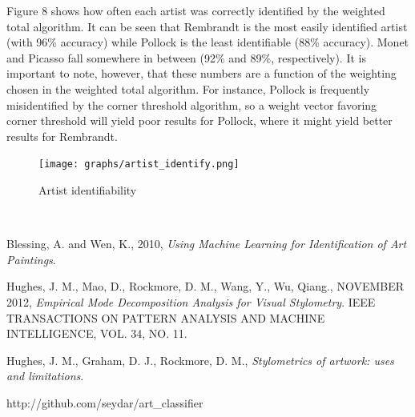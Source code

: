 \documentclass{article}
\begin{document}
  Figure 8 shows how often each artist was correctly identified by the
  weighted total algorithm. It can be seen that Rembrandt is the most easily
  identified artist (with 96\% accuracy) while Pollock is the least identifiable
  (88\% accuracy). Monet and Picasso fall somewhere in between (92\% and 89\%,
  respectively). It is important to note, however, that these numbers are a
  function of the weighting chosen in the weighted total algorithm. For instance,
  Pollock is frequently misidentified by the corner threshold algorithm, so a
  weight vector favoring corner threshold will yield poor results for Pollock,
  where it might yield better results for Rembrandt. 
  \begin{figure}[h!]
    \begin{center}
      \texttt{[image: graphs/artist\_identify.png]}
      \caption{Artist identifiability}
    \end{center}
  \end{figure} \\

  \begin{thebibliography}{1}
     Blessing, A. and Wen, K.,
    2010,
    \emph{Using Machine Learning for Identification of Art Paintings}.
  
     Hughes, J. M., Mao, D., Rockmore, D. M.,
    Wang, Y., Wu, Qiang.,
    NOVEMBER 2012,
    \emph{Empirical Mode Decomposition Analysis for Visual Stylometry}.
    IEEE TRANSACTIONS ON PATTERN ANALYSIS AND MACHINE INTELLIGENCE,
    VOL. 34,
    NO. 11.
  
     Hughes, J. M., Graham, D. J., Rockmore, D. M.,
    \emph{Stylometrics of artwork: uses and limitations}.

     http://github.com/seydar/art\_classifier
  
  \end{thebibliography}
\end{document}
